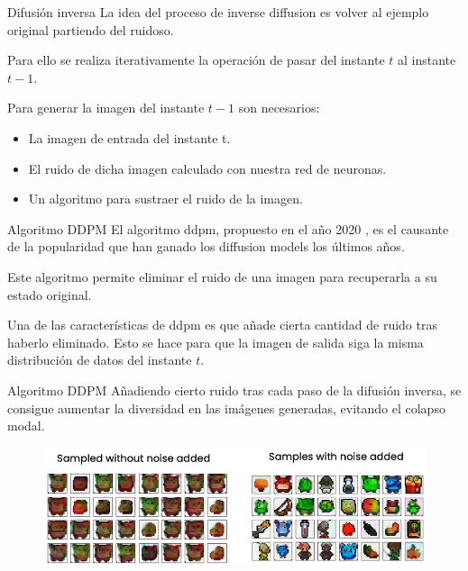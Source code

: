 \begin{frame}{Difusión inversa}
La idea del proceso de inverse diffusion es volver al \alert{ejemplo original} partiendo del \alert{ruidoso}. 

Para ello se realiza \alert{iterativamente} la operación de pasar del instante \alert{$t$} al instante \alert{$t-1$}.

Para generar la imagen del instante \alert{$t-1$} son necesarios:
\begin{itemize}
    \item La \alert{imagen de entrada} del instante \alert{t}.
    \item El \alert{ruido} de dicha imagen calculado con nuestra red de neuronas.
    \item Un algoritmo para \alert{sustraer} el ruido de la imagen.
\end{itemize}
\end{frame}

\begin{frame}{Algoritmo DDPM}
El algoritmo \gls{ddpm}, propuesto en el año 2020 \cite{ho2020denoising}, es el \alert{causante de la popularidad} que han ganado los diffusion models los últimos años.

Este algoritmo permite \alert{eliminar} el ruido de una imagen para recuperarla a su estado original.

Una de las características de \gls{ddpm} es que añade \alert{cierta cantidad de ruido} tras haberlo eliminado. Esto se hace para que la imagen de salida siga la misma \alert{distribución de datos} del instante $t$.
\end{frame}

\begin{frame}{Algoritmo DDPM}
Añadiendo cierto ruido tras cada paso de la difusión inversa, se consigue aumentar la \alert{diversidad} en las imágenes generadas, evitando el colapso modal.

\begin{figure}
    \centering
    \includegraphics[width=\textwidth]{Slides/figures/Diffusion_Models/DDPM_Variation.png}
    \caption{\cite{DeepLearningDifussionModelCourse}}
\end{figure}
\end{frame}

